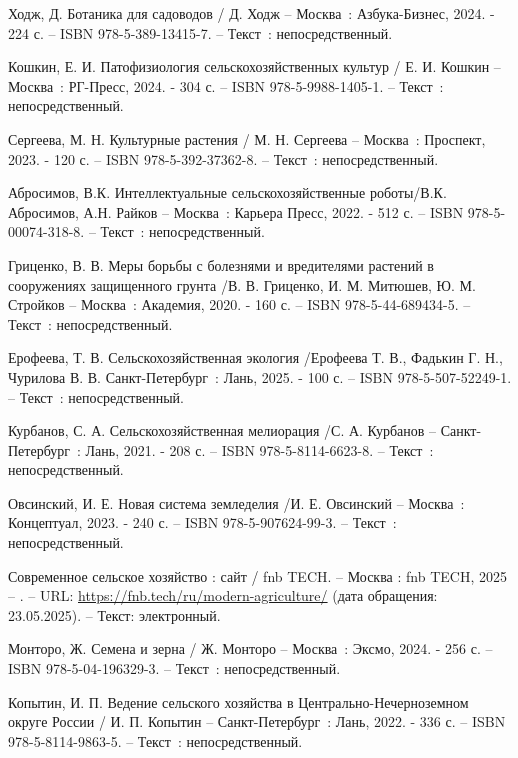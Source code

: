 
\begin{thebibliography}{9}
	 Ходж, Д. Ботаника для садоводов / Д. Ходж – Москва~: Азбука-Бизнес, 2024. - 224 с. – ISBN 978-5-389-13415-7. – Текст~: непосредственный.
	
	 Кошкин, Е. И. Патофизиология сельскохозяйственных культур / Е. И. Кошкин – Москва~: РГ-Пресс, 2024. - 304 с. – ISBN 978-5-9988-1405-1. – Текст~: непосредственный.	
	
	 Сергеева, М. Н. Культурные растения / М. Н. Сергеева – Москва~: Проспект, 2023. - 120 с. – ISBN 978-5-392-37362-8. – Текст~: непосредственный.	
	
	 Абросимов, В.К. Интеллектуальные сельскохозяйственные роботы/В.К. Абросимов, А.Н. Райков – Москва~: Карьера Пресс, 2022. - 512 с. – ISBN 978-5-00074-318-8. – Текст~: непосредственный.	

	  Гриценко, В. В. Меры борьбы с болезнями и вредителями растений в сооружениях защищенного грунта /В. В. Гриценко, И. М. Митюшев, Ю. М. Стройков  – Москва~: Академия, 2020. - 160 с. – ISBN 978-5-44-689434-5. – Текст~: непосредственный.	
	
	 Ерофеева, Т. В. Сельскохозяйственная экология /Ерофеева Т. В., Фадькин Г. Н., Чурилова В. В.  Санкт-Петербург~: Лань, 2025. - 100 с. – ISBN 978-5-507-52249-1. – Текст~: непосредственный.	
	
	 Курбанов, С. А. Сельскохозяйственная мелиорация /С. А. Курбанов  – Санкт-Петербург~: Лань, 2021. - 208 с. – ISBN 978-5-8114-6623-8. – Текст~: непосредственный.	
	
	 Овсинский, И. Е. Новая система земледелия /И. Е. Овсинский  – Москва~: Концептуал, 2023. - 240 с. – ISBN 978-5-907624-99-3. – Текст~: непосредственный.	
	
	 Современное сельское хозяйство : сайт / fnb TECH. – Москва : fnb TECH, 2025 – . – URL: \url{https://fnb.tech/ru/modern-agriculture/} (дата обращения: 23.05.2025). – Текст: электронный.
		
	 Монторо, Ж. Семена и зерна / Ж. Монторо  – Москва~: Эксмо, 2024. - 256 с. – ISBN 978-5-04-196329-3. – Текст~: непосредственный.
	
	Копытин, И. П. Ведение сельского хозяйства в Центрально-Нечерноземном округе России / И. П. Копытин  – Санкт-Петербург~: Лань, 2022. - 336 с. – ISBN 978-5-8114-9863-5. – Текст~: непосредственный.	
	

\end{thebibliography}
